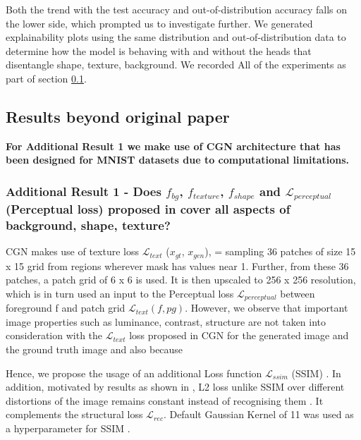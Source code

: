 Both the trend with the test accuracy and out-of-distribution accuracy falls on the lower side, which prompted us to investigate further. We generated explainability plots using the same distribution and out-of-distribution data to determine how the model is behaving with and without the heads that disentangle shape, texture, background. We recorded All of the experiments as part of section \ref{section:resultsbeyondpaper}.

\subsection{Results beyond original paper}
\label{section:resultsbeyondpaper}
\textbf{For Additional Result 1 we make use of CGN\cite{sauer2021counterfactual} architecture that has been designed for MNIST datasets due to computational limitations.}
\subsubsection{Additional Result 1 - Does  $f_{bg}$, $f_{texture}$, $f_{shape}$ and $\mathcal{L}_{perceptual}$ (Perceptual loss) proposed in \cite{sauer2021counterfactual} cover all aspects of background, shape, texture? }

CGN \cite{sauer2021counterfactual} makes use of texture loss $\mathcal{L}_{text}$ ($x_{gt}$, $x_{gen}$), = sampling 36 patches of size 15 x 15 grid from regions wherever mask has values near 1. Further, from these 36 patches, a patch grid of 6 x 6 is used. It is then upscaled to 256 x 256 resolution, which is in turn used an input to the Perceptual loss $\mathcal{L}_{perceptual}$ between foreground f and patch grid $\mathcal{L}_{text} (f, pg)$. 
However, we observe that important image properties such as luminance, contrast, structure are not taken into consideration with the $\mathcal{L}_{text}$ loss proposed in CGN \cite{sauer2021counterfactual} for the generated image and the ground truth image and also because 

Hence, we propose the usage of an additional Loss function $\mathcal{L}_{ssim}$ (SSIM) \cite{wang2004image}. In addition, motivated by results as shown in \cite{zhao2016loss}, \cite{pandey2020unsupervised} L2 loss unlike SSIM \cite{wang2004image} over different distortions of the image remains constant instead of recognising them . It complements the structural loss $\mathcal{L}_{rec}$. 
Default Gaussian Kernel of 11 was used as a hyperparameter for SSIM \cite{wang2004image}.

